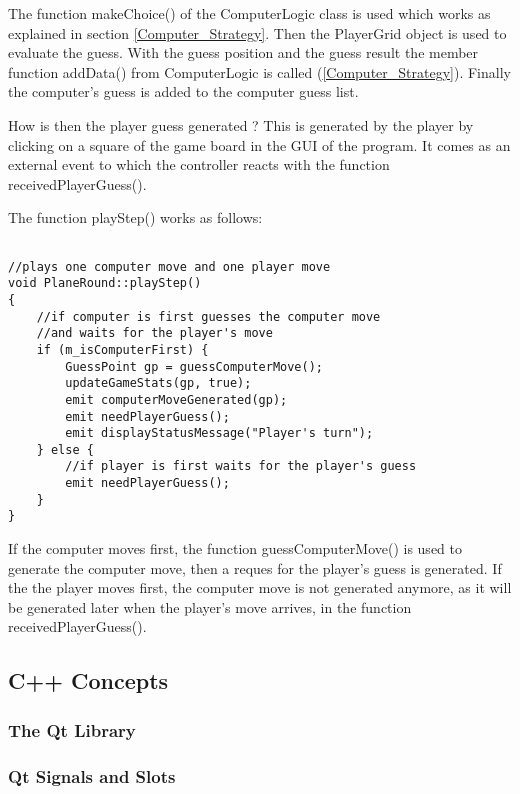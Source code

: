 The function makeChoice() of the ComputerLogic class is used which works as explained in section \ref{Computer_Strategy}. Then the PlayerGrid object is used to evaluate the guess. With the guess position and the guess result the member function addData() from ComputerLogic is called (\ref{Computer_Strategy}). Finally the computer's guess is added to the computer guess list. 

How is then the player guess generated ? This is generated by the player by clicking on a square of the game board in the GUI of the program. It comes as an external event to which the controller reacts with the function receivedPlayerGuess().

The function playStep() works as follows:

\begin{lstlisting}

//plays one computer move and one player move
void PlaneRound::playStep()
{
	//if computer is first guesses the computer move
	//and waits for the player's move
	if (m_isComputerFirst) {
		GuessPoint gp = guessComputerMove();
		updateGameStats(gp, true);
		emit computerMoveGenerated(gp);
		emit needPlayerGuess();
		emit displayStatusMessage("Player's turn");
	} else {
		//if player is first waits for the player's guess
		emit needPlayerGuess();
	}
}

\end{lstlisting}

If the computer moves first, the function guessComputerMove() is used to generate the computer move, then a reques for the player's guess is generated. If the the player moves first, the computer move is not generated anymore, as it will be generated later when the player's move arrives, in the function receivedPlayerGuess().

\subsection{C++ Concepts}

\subsubsection{The Qt Library}

\subsubsection{Qt Signals and Slots} \label {Qt_Signals_Slots}
